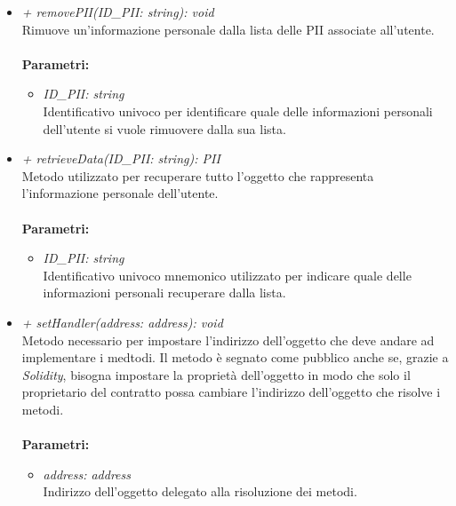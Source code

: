 \begin{itemize}
\begin{itemize}
		\item \textit{+ removePII(ID\_PII: string): void}\\
		Rimuove un'informazione personale dalla lista delle \gls{PII} associate all'utente.\\\\
		\textbf{Parametri:}
		\begin{itemize}
			\item \textit{ID\_PII: string}\\
			Identificativo univoco per identificare quale delle informazioni personali dell'utente si vuole rimuovere dalla sua lista.
		\end{itemize}
		\item \textit{+ retrieveData(ID\_PII: string): PII}\\
		Metodo utilizzato per recuperare tutto l'oggetto che rappresenta l'informazione personale dell'utente.\\\\
		\textbf{Parametri:}
		\begin{itemize}
			\item \textit{ID\_PII: string}\\
			Identificativo univoco mnemonico utilizzato per indicare quale delle informazioni personali recuperare dalla lista.
		\end{itemize}
		\item \textit{+ setHandler(address: address): void}\\
		Metodo necessario per impostare l'indirizzo dell'oggetto che deve andare ad implementare i medtodi. Il metodo è segnato come pubblico anche se, grazie a \textit{Solidity}, bisogna impostare la proprietà dell'oggetto in modo che solo il proprietario del contratto possa cambiare l'indirizzo dell'oggetto che risolve i metodi.\\\\
		\textbf{Parametri:}
		\begin{itemize}
			\item \textit{address: address}\\
			Indirizzo dell'oggetto delegato alla risoluzione dei metodi.
		\end{itemize}
	\end{itemize}
\end{itemize}
